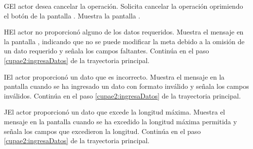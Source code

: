 \begin{UCtrayectoriaA}{G}{El actor desea cancelar la operación.}
	\UCpaso[\UCactor] Solicita cancelar la operación oprimiendo el botón  de la pantalla .
	\UCpaso[\UCsist] Muestra la pantalla  .
\end{UCtrayectoriaA} 

\begin{UCtrayectoriaA}{H}{El actor no proporcionó alguno de los datos requeridos.}
	\UCpaso[\UCsist] Muestra el mensaje  en la pantalla ,
	indicando que no se puede modificar la meta debido a la omisión de un dato requerido y señala los campos faltantes.
	\UCpaso[] Continúa en el paso \ref{cupae2:ingresaDatos} de la trayectoria principal.
\end{UCtrayectoriaA}

\begin{UCtrayectoriaA}{I}{El actor proporcionó un dato que es incorrecto.}
	\UCpaso[\UCsist] Muestra el mensaje  en la pantalla 
	cuando se ha ingresado un dato con formato inválido y señala los campos inválidos.
	\UCpaso[] Continúa en el paso \ref{cupae2:ingresaDatos} de la trayectoria principal.
\end{UCtrayectoriaA}
 
\begin{UCtrayectoriaA}{J}{El actor proporcionó un dato que excede la longitud máxima.}
	\UCpaso[\UCsist] Muestra el mensaje  en la pantalla 
	cuando se ha excedido la longitud máxima permitida y señala los campos que excedieron la longitud.
	\UCpaso[] Continúa en el paso \ref{cupae2:ingresaDatos} de la trayectoria principal.
\end{UCtrayectoriaA}
